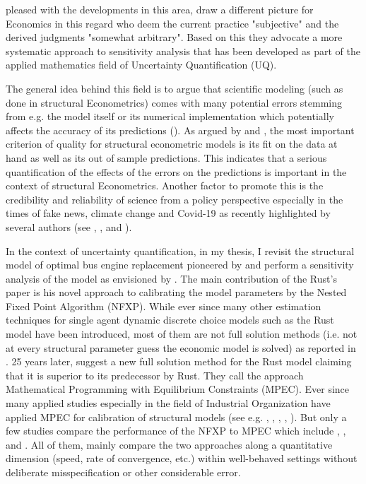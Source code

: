 pleased with the developments in this area, \cite{Harenberg.2019} draw a different picture for Economics in this regard who deem the current practice "subjective" and the derived judgments "somewhat arbitrary". Based on this they advocate a more systematic approach to sensitivity analysis that has been developed as part of the applied mathematics field of Uncertainty Quantification (UQ).

The general idea behind this field is to argue that scientific modeling (such as done in structural Econometrics) comes with many potential errors stemming from e.g. the model itself or its numerical implementation which potentially affects the accuracy of its predictions (\cite{Smith.2013}). As argued by \cite{Keane.2010} and \cite{Rust.2010}, the most important criterion of quality for structural econometric models is its fit on the data at hand as well as its out of sample predictions. This indicates that a serious quantification of the effects of the errors on the predictions is important in the context of structural Econometrics. Another factor to promote this is the credibility and reliability of science from a policy perspective especially in the times of fake news, climate change and Covid-19 as recently highlighted by several authors (see \cite{Fischhoff.2014} \cite{DeBruin.2019}, \cite{VanDerBles.2019}, \cite{Manski.2019} and \cite{Manski.2020}).

In the context of uncertainty quantification, in my thesis, I revisit the structural model of optimal bus engine replacement pioneered by \cite{Rust.1987} and perform a sensitivity analysis of the model as envisioned by \cite{Leamer.1983}. The main contribution of the Rust's paper is his novel approach to calibrating the model parameters by the Nested Fixed Point Algorithm (NFXP). While ever since many other estimation techniques for single agent dynamic discrete choice models such as the Rust model have been introduced, most of them are not full solution methods (i.e. not at every structural parameter guess the economic model is solved) as reported in \cite{Aguirregabiri.2010}. 25 years later, \cite{Su.Judd.2012} suggest a new full solution method for the Rust model claiming that it is superior to its predecessor by Rust. They call the approach Mathematical Programming with Equilibrium Constraints (MPEC). Ever since many applied studies especially in the field of Industrial Organization have applied MPEC for calibration of structural models (see e.g. \cite{Aryal.2013}, \cite{Kaiser.2014}, \cite{Hubbard.2009}, \cite{Reynaert.2014}, \cite{Freyberger.2015}). But only a few studies compare the performance of the NFXP to MPEC which include \cite{Su.Judd.2012}, \cite{Dube.Fox.Su.2012}, \cite{Iskhakov.2016} and \cite{Dong.Hsieh.Zhang.2017}. All of them, mainly compare the two approaches along a quantitative dimension (speed, rate of convergence, etc.) within well-behaved settings without deliberate misspecification or other considerable error.

